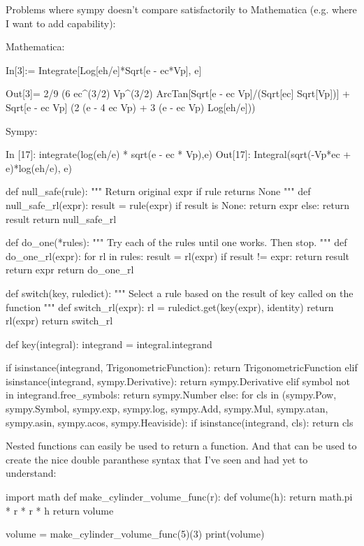 

  Problems where sympy doesn't compare satisfactorily to Mathematica (e.g. where I want to add capability):

Mathematica:

In[3]:= Integrate[Log[eh/e]*Sqrt[e - ec*Vp], e]

Out[3]= 2/9 (6 ec^(3/2) Vp^(3/2)
     ArcTan[Sqrt[e - ec Vp]/(Sqrt[ec] Sqrt[Vp])] +
   Sqrt[e - ec Vp] (2 (e - 4 ec Vp) + 3 (e - ec Vp) Log[eh/e]))

Sympy:

In [17]: integrate(log(eh/e) * sqrt(e - ec * Vp),e)
Out[17]: Integral(sqrt(-Vp*ec + e)*log(eh/e), e)

def null_safe(rule):
    """ Return original expr if rule returns None """
    def null_safe_rl(expr):
        result = rule(expr)
        if result is None:
            return expr
        else:
            return result
    return null_safe_rl

def do_one(*rules):
    """ Try each of the rules until one works. Then stop. """
    def do_one_rl(expr):
        for rl in rules:
            result = rl(expr)
            if result != expr:
                return result
        return expr
    return do_one_rl

def switch(key, ruledict):
    """ Select a rule based on the result of key called on the function """
    def switch_rl(expr):
        rl = ruledict.get(key(expr), identity)
        return rl(expr)
    return switch_rl

def key(integral):
    integrand = integral.integrand

    if isinstance(integrand, TrigonometricFunction):
        return TrigonometricFunction
    elif isinstance(integrand, sympy.Derivative):
        return sympy.Derivative
    elif symbol not in integrand.free_symbols:
        return sympy.Number
    else:
        for cls in (sympy.Pow, sympy.Symbol, sympy.exp, sympy.log,
                    sympy.Add, sympy.Mul, sympy.atan, sympy.asin, sympy.acos, sympy.Heaviside):
            if isinstance(integrand, cls):
                return cls


Nested functions can easily be used to return a function. And that can be used to create the nice double paranthese syntax that I've seen and had yet to understand:

import math
def make_cylinder_volume_func(r):
    def volume(h):
        return math.pi * r * r * h
    return volume

volume = make_cylinder_volume_func(5)(3)
print(volume)

